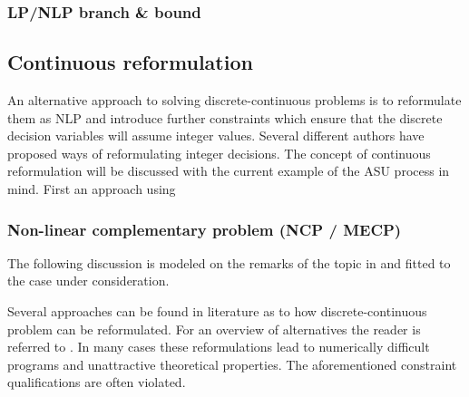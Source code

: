         \subsubsection{LP/NLP branch \& bound}



    \subsection{Continuous reformulation}
    \label{sec:opt:theory:continuous}
    An alternative approach to solving discrete-continuous problems is to reformulate them as NLP
    and introduce further constraints which ensure that the discrete decision variables will assume integer values.
    Several different authors have proposed ways of reformulating integer decisions. The concept of continuous reformulation
    will be discussed with the current example of the ASU process in mind. First an approach using 
    
        \subsubsection{Non-linear complementary problem (NCP / MECP)}
        The following discussion is modeled on the remarks of the topic in \cite{Stein.2004} and fitted to the case under consideration.
    
%    
        Several approaches can be found in literature as to how discrete-continuous problem can be reformulated. For an overview of alternatives
        the reader is referred to \cite{Stein.2004}. In many cases these reformulations lead to numerically difficult programs and 
        unattractive theoretical properties. The aforementioned constraint qualifications are often violated.  
    

